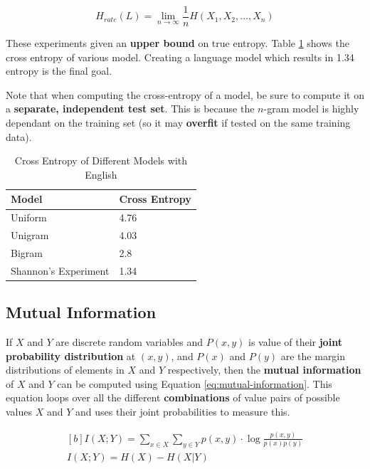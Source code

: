 \documentclass{article}
\begin{document}
\begin{equation}
	H_{rate}(L) = \lim_{n \rightarrow \infty} \frac{1}{n}H(X_1,X_2,...,X_n)
	\label{eq:entropy-language}
\end{equation}

These experiments given an \textbf{upper bound} on true entropy. Table \ref{tab:entropy-rates-of-english} shows the cross entropy of various model. Creating a language model which results in 1.34 entropy is the final goal.

Note that when computing the cross-entropy of a model, be sure to compute it on a \textbf{separate, independent test set}. This is because the $n$-gram model is highly dependant on the training set (so it may \textbf{overfit} if tested on the same training data).

\begin{table}
	\centering
	\begin{tabular}{|l|l|}
		\hline
		\textbf{Model} & \textbf{Cross Entropy} \\
		\hline
		Uniform & 4.76 \\
		Unigram & 4.03 \\
		Bigram & 2.8 \\
		Shannon's Experiment & 1.34 \\
		\hline
	\end{tabular}
	\caption{Cross Entropy of Different Models with English}
	\label{tab:entropy-rates-of-english}
\end{table}

\subsection{Mutual Information}
\label{sec:mutual-information}

If $X$ and $Y$ are discrete random variables and $P(x, y)$ is value of their \textbf{joint probability distribution} at $(x, y)$, and $P(x)$ and $P(y)$ are the margin distributions of elements in $X$ and $Y$ respectively, then the \textbf{mutual information} of $X$ and $Y$ can be computed using Equation \ref{eq:mutual-information}. This equation loops over all the different \textbf{combinations} of value pairs of possible values $X$ and $Y$ and uses their joint probabilities to measure this.

\begin{equation}\begin{aligned}[b]
	I(X;Y) = \sum_{x \in X} { \sum_{y \in Y} {
		p(x, y) \cdot \log{\frac{p(x,y)}{p(x)p(y)}}
	} } \\
	I(X;Y) = H(X) - H(X|Y)
	\end{aligned}
	\label{eq:mutual-information}
\end{equation}
\end{document}
